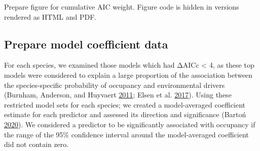 \documentclass[
]{article}
\newenvironment{Shaded}{}{}
\newcommand{\CommentTok}[1]{\textcolor[rgb]{0.00,0.50,0.00}{#1}}
\newcommand{\DataTypeTok}[1]{#1}
\newcommand{\KeywordTok}[1]{\textcolor[rgb]{0.00,0.00,1.00}{#1}}
\newcommand{\NormalTok}[1]{#1}
\newcommand{\OperatorTok}[1]{#1}
\newcommand{\StringTok}[1]{\textcolor[rgb]{0.00,0.50,0.50}{#1}}
\begin{document}
\begin{Shaded}
\end{Shaded}

Prepare figure for cumulative AIC weight. Figure code is hidden in versions rendered as HTML and PDF.

\hypertarget{prepare-model-coefficient-data}{%
\subsection{Prepare model coefficient data}\label{prepare-model-coefficient-data}}

For each species, we examined those models which had ΔAICc \textless{} 4, as these top models were considered to explain a large proportion of the association between the species-specific probability of occupancy and environmental drivers (Burnham, Anderson, and Huyvaert \protect\hyperlink{ref-burnham2011}{2011}; Elsen et al. \protect\hyperlink{ref-elsen2017}{2017}). Using these restricted model sets for each species; we created a model-averaged coefficient estimate for each predictor and assessed its direction and significance (Bartoń \protect\hyperlink{ref-MuMIn}{2020}). We considered a predictor to be significantly associated with occupancy if the range of the 95\% confidence interval around the model-averaged coefficient did not contain zero.
\end{document}
